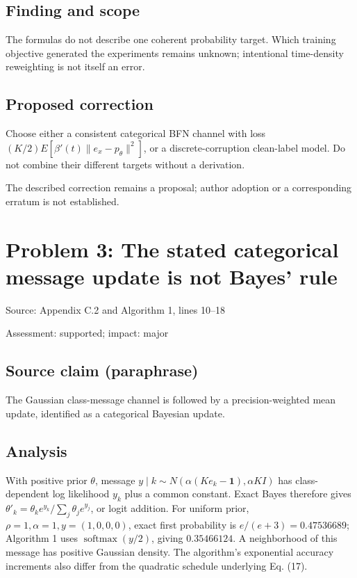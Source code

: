\documentclass[11pt]{article}
\begin{document}
\subsection*{Finding and scope}

The formulas do not describe one coherent probability target. Which training objective generated the experiments remains unknown; intentional time-density reweighting is not itself an error.

\subsection*{Proposed correction}

Choose either a consistent categorical BFN channel with loss \((K/2)E[\beta'(t)\|e_x-p_\theta\|^2]\), or a discrete-corruption clean-label model. Do not combine their different targets without a derivation.

The described correction remains a proposal; author adoption or a corresponding erratum is not established.

\section*{Problem 3: The stated categorical message update is not Bayes’ rule}

Source: Appendix C.2 and Algorithm 1, lines 10–18

Assessment: supported; impact: major

\subsection*{Source claim (paraphrase)}

The Gaussian class-message channel is followed by a precision-weighted mean update, identified as a categorical Bayesian update.

\subsection*{Analysis}

With positive prior \(\theta\), message \(y\mid k\sim N(\alpha(Ke_k-\mathbf1),\alpha K I)\) has class-dependent log likelihood \(y_k\) plus a common constant. Exact Bayes therefore gives \(\theta'_k=\theta_ke^{y_k}/\sum_j\theta_je^{y_j}\), or logit addition. For uniform prior, \(\rho=1,\alpha=1,y=(1,0,0,0)\), exact first probability is \(e/(e+3)=0.47536689\); Algorithm 1 uses \(\operatorname{softmax}(y/2)\), giving \(0.35466124\). A neighborhood of this message has positive Gaussian density. The algorithm’s exponential accuracy increments also differ from the quadratic schedule underlying Eq. (17).
\end{document}
